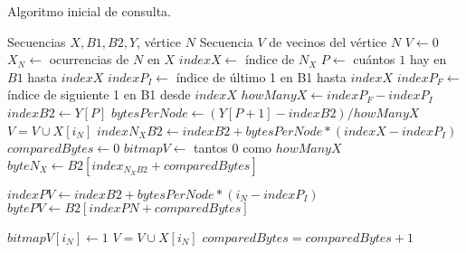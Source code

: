 \begin{algorithm}
\caption{Algoritmo inicial de consulta.}
\label{alg:ask}
\begin{algorithmic}[1]
\REQUIRE Secuencias $X, B1, B2, Y$, vértice $N$
\ENSURE Secuencia $V$ de vecinos del vértice $N$
\STATE $V \leftarrow 0$
\STATE $X_{N} \leftarrow $ ocurrencias de $N$ en $X$
	\STATE $indexX \leftarrow$ índice de $N_{X}$
	\STATE $P \leftarrow $ cuántos $1$ hay en $B1$ hasta $indexX$ 
	\STATE $indexP_{I} \leftarrow $  índice de último 1 en B1 hasta $indexX$  
	\STATE $indexP_{F} \leftarrow $  índice de siguiente 1 en B1 desde $indexX$ 
	\STATE $howManyX \leftarrow indexP_{F} - indexP_{I}$ 
	\STATE $indexB2 \leftarrow Y[P]$ 
	\STATE $bytesPerNode \leftarrow (Y[P +1] - indexB2) / howManyX$
				\STATE $V = V \cup X[i_{N}]$
			\ENDIF
		\ENDFOR
	\ELSE
		\STATE $indexN_{X}B2 \leftarrow indexB2 + bytesPerNode * (indexX - indexP_{I})$
		\STATE $comparedBytes \leftarrow 0$
		\STATE $bitmapV \leftarrow $ tantos $0$ como $howManyX$
		\REPEAT
			\STATE $byteN_{X} \leftarrow B2[index_{N_{X}B2} + comparedBytes]$
		
		
					\STATE $indexPV \leftarrow  indexB2 + bytesPerNode * (i_{N} - indexP_{I})$
					\STATE $bytePV \leftarrow B2[indexPN + comparedBytes]$
				
						\STATE $bitmapV[i_{N}] \leftarrow 1$
						\STATE $V = V \cup X[i_{N}]$
					\ENDIF
				\ENDIF
			\ENDFOR
			\STATE $comparedBytes = comparedBytes + 1$
		
	\ENDIF

\ENDFOR
\end{algorithmic}
\end{algorithm}
